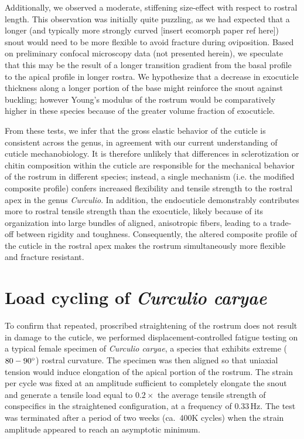 \documentclass[twocolumn, linenumbers, superscriptaddress, nofootinbib]{revtex4-1}
\begin{document}
		Additionally, we observed a moderate, stiffening size-effect with respect to rostral length.
		This observation was initially quite puzzling, as we had expected that a longer (and typically more strongly curved [insert ecomorph paper ref here]) snout would need to be more flexible to avoid fracture during oviposition.
		Based on preliminary confocal microscopy data (not presented herein), we speculate that this may be the result of a longer transition gradient from the basal profile to the apical profile in longer rostra.
		We hypothesize that a decrease in exocuticle thickness along a longer portion of the base might reinforce the snout against buckling; however Young's modulus of the rostrum would be comparatively higher in these species because of the greater volume fraction of exocuticle.
		
		From these tests, we infer that the gross elastic behavior of the cuticle is consistent across the genus, in agreement with our current understanding of cuticle mechanobiology.
		It is therefore unlikely that differences in sclerotization or chitin composition within the cuticle are responsible for the mechanical behavior of the rostrum in different species; instead, a single mechanism (i.e. the modified composite profile) confers increased flexibility and tensile strength to the rostral apex in the genus \textit{Curculio}.
		In addition, the endocuticle demonstrably contributes more to rostral tensile strength than the exocuticle, likely because of its organization into large bundles of aligned, anisotropic fibers, leading to a trade-off between rigidity and toughness.
		Consequently, the altered composite profile of the cuticle in the rostral apex makes the rostrum simultaneously more flexible and fracture resistant.
	
	\section{Load cycling of \textit{Curculio caryae}}
		To confirm that repeated, proscribed straightening of the rostrum does not result in damage to the cuticle, we performed displacement-controlled fatigue testing on a typical female specimen of \textit{Curculio caryae}, a species that exhibits extreme ($80-90\degree$) rostral curvature.
		The specimen was then aligned so that uniaxial tension would induce elongation of the apical portion of the rostrum.
		The strain per cycle was fixed at an amplitude sufficient to completely elongate the snout and generate a tensile load equal to $0.2\times$ the average tensile strength of conspecifics in the straightened configuration, at a frequency of $0.33\,\text{Hz}$.
		The test was terminated after a period of two weeks (ca.~400K cycles) when the strain amplitude appeared to reach an asymptotic minimum.		
		
\end{document}
